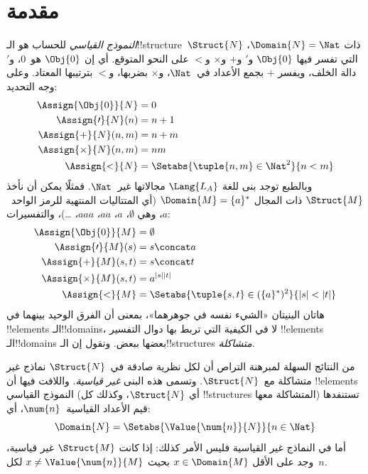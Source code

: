 \documentclass[../../../include/open-logic-section]{subfiles}
\begin{document}
\section{مقدمة}

\emph{النموذج القياسي} للحساب هو الـ!!{structure}~$\Struct{N}$ ذات
$\Domain{N} = \Nat$، التي تفسر فيها $\Obj{0}$ و$\prime$ و$+$ و$\times$
و$<$ على النحو المتوقع. أي إن $\Obj{0}$ هو~$0$، و$\prime$ دالة الخلف،
ويفسر $+$ بجمع الأعداد في~$\Nat$، و$\times$ بضربها، و$<$ بترتيبها
المعتاد. وعلى وجه التحديد:
\begin{align*}
  \Assign{\Obj{0}}{N} & = 0\\
  \Assign{\prime}{N}(n) & = n + 1\\
  \Assign{+}{N}(n, m) & = n + m\\
  \Assign{\times}{N}(n, m) & = nm\\
  \Assign{<}{N} & = \Setabs{\tuple{n,m} \in \Nat^2}{n<m}
\end{align*}
وبالطبع توجد بنى للغة $\Lang{L_A}$ مجالاتها غير~$\Nat$. فمثلًا يمكن أن
نأخذ $\Struct{M}$ ذات المجال $\Domain{M} = \{a\}^*$ (أي المتتاليات
المنتهية للرمز الواحد~$a$، وهي $\emptyset$، $a$، $aa$، $aaa$، \dots)،
والتفسيرات:
\begin{align*}
  \Assign{\Obj{0}}{M} & = \emptyset\\
  \Assign{\prime}{M}(s) & = s \concat a\\
  \Assign{+}{M}(s, t) & = s \concat t\\
  \Assign{\times}{M}(s, t) & = a^{\lvert s\rvert\lvert t\rvert}\\
  \Assign{<}{M} & = \Setabs{\tuple{s,t} \in (\{a\}^*)^2}{\lvert s\rvert<\lvert t\rvert}
\end{align*}
هاتان البنيتان «الشيء نفسه في جوهرهما»، بمعنى أن الفرق الوحيد بينهما في
!!{element}s الـ!!{domain}s، لا في الكيفية التي تربط بها دوال التفسير
!!{element}s الـ!!{domain}s بعضها ببعض. ونقول إن الـ!!{structure}s
\emph{متشاكلة}.

من النتائج السهلة لمبرهنة التراص أن لكل نظرية صادقة في~$\Struct{N}$
نماذج غير متشاكلة مع~$\Struct{N}$. وتسمى هذه البنى \emph{غير قياسية}.
واللافت فيها أن !!{element}s النموذج القياسي (أي $\Struct{N}$، وكذلك كل
!!{structure}s المتشاكلة معها) تستنفدها قيم الأعداد القياسية~$\num{n}$،
أي:
\[
\Domain{N} = \Setabs{\Value{\num{n}}{N}}{n \in \Nat}
\]
أما في النماذج غير القياسية فليس الأمر كذلك: إذا كانت $\Struct{M}$ غير
قياسية، وجد على الأقل $x \in \Domain{M}$ بحيث
$x \neq \Value{\num{n}}{M}$ لكل~$n$.
\end{document}
